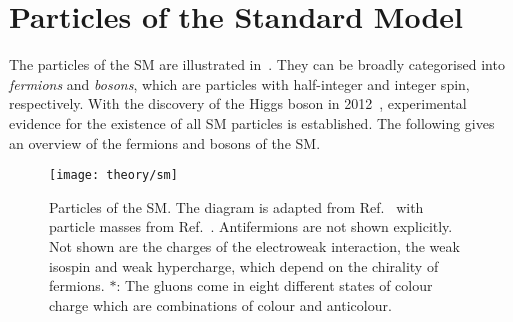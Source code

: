 \section{Particles of the Standard Model}%
\label{sec:sm_overview}

The particles of the SM are illustrated in~. They can be
broadly categorised into \emph{fermions} and \emph{bosons}, which are particles
with half-integer and integer spin, respectively. With the discovery of the
Higgs boson in 2012~\cite{HIGG-2012-27,CMS-HIG-12-028}, experimental evidence
for the existence of all SM particles is established. The following gives an
overview of the fermions and bosons of the SM.


\begin{figure}[htbp]
  \centering

  \texttt{[image: theory/sm]}

  \caption{Particles of the SM. The diagram is adapted from Ref.~\cite{sm_tikz}
    with particle masses from Ref.~\cite{pdg2020}. Antifermions are not shown
    explicitly.  Not shown are the charges of the electroweak interaction, the
    weak isospin and weak hypercharge, which depend on the chirality of
    fermions. $*$: The gluons come in eight different states of colour charge
    which are combinations of colour and anticolour.}%
  \label{fig:sm_particles}
\end{figure}

